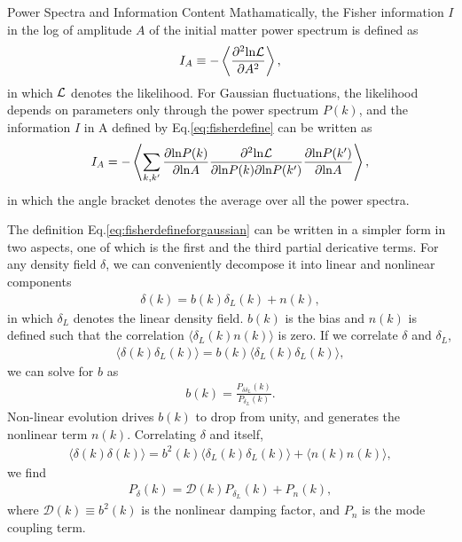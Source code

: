 \begin{section}{Power Spectra and Information Content}
   Mathamatically, the Fisher information \cite{bib:Tegmark1997} $I$ in the log of amplitude $A$ of the initial 
matter power spectrum is defined as 
\begin{align}
   I_A \equiv -\left\langle \frac{\partial ^2 \mathrm{ln \mathcal{L}}}{\partial A ^2}\right\rangle,
\label{eq:fisherdefine}
\end{align}
   in which $\mathcal{L}$ denotes the likelihood. For Gaussian fluctuations, the likelihood depends on
parameters only through the power spectrum $P(k)$, and the information $I$ in A defined by Eq.\ref{eq:fisherdefine}
can be written as \cite{bib:Rimes2006}
\begin{align}
    I_A = - \left\langle \sum_{k,k'} \frac{\partial \mathrm{ln} P(k)}{\partial \mathrm{ln} A} 
\frac{\partial ^2 \mathrm{ln \mathcal{L}}}{\partial \mathrm{ln} P(k) \partial \mathrm{ln} P(k')}
\frac{\partial \mathrm{ln} P(k')}{\partial \mathrm{ln} A}\right\rangle,
\label{eq:fisherdefineforgaussian}
\end{align}
in which the angle bracket denotes the average over all the power spectra.

  The definition Eq.\ref{eq:fisherdefineforgaussian} can be written in a simpler form in two aspects, one 
of which is the first and the third partial dericative terms. 
For any density field $\delta$, we can conveniently decompose it into linear and nonlinear components
\begin{align}
    \delta (k) = b (k) \delta _L (k) + n (k),
\label{eq:decompose}
\end{align}
in which $\delta_L$ denotes the linear density field. $b (k)$ is the bias and $n (k)$ is defined  
such that the correlation $\langle \delta_L (k) n (k) \rangle$ is zero. If we correlate  
$\delta$ and $\delta_L$,
\begin{align}
   \langle \delta (k) \delta_L (k) \rangle = b (k) \langle \delta_L (k) \delta_L (k) \rangle,
\label{eq:correlating}
\end{align} 
    we can solve for $b$ as 
\begin{align}
    b (k) = \frac{P _{\delta \delta_L}(k)}{P_{\delta_L}(k)}.
\label{eq:bofk}
\end{align}
Non-linear evolution drives $b (k)$ to drop from unity, and generates the nonlinear term $n (k)$. 
Correlating $\delta$ and itself, 
\begin{align}
  \langle \delta (k) \delta (k) \rangle = b^2 (k) \langle \delta_L (k) \delta_L (k) \rangle + \langle n(k)n(k) \rangle,
\end{align}
we find 
\begin{align}
   P_\delta (k) = \mathcal{D} (k) P_{\delta_L} (k) + P_n (k),
\label{eq:powerdecompose}
\end{align}
where $\mathcal{D}(k) \equiv b^2 (k)$ is the nonlinear damping factor, and $P_n$ is the mode coupling term.


\end{section}
